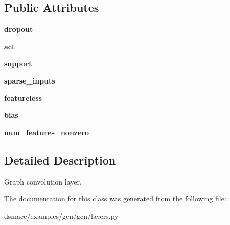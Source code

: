 \subsection*{Public Attributes}
\begin{DoxyCompactItemize}
\item 
\mbox{\label{classgcn_1_1layers_1_1GraphConvolution_a55566986f13fec70ecf245a72c54027a}} 
{\bfseries dropout}
\item 
\mbox{\label{classgcn_1_1layers_1_1GraphConvolution_a3b34872ff04fd5f1480f54d26b6fab4b}} 
{\bfseries act}
\item 
\mbox{\label{classgcn_1_1layers_1_1GraphConvolution_afddf607a8ac18269481c249c1d82b46f}} 
{\bfseries support}
\item 
\mbox{\label{classgcn_1_1layers_1_1GraphConvolution_aab6ab179798b8e55fa2c7f2e6337d9f6}} 
{\bfseries sparse\+\_\+inputs}
\item 
\mbox{\label{classgcn_1_1layers_1_1GraphConvolution_a7885c991bce88b777c2318ee03db6ea4}} 
{\bfseries featureless}
\item 
\mbox{\label{classgcn_1_1layers_1_1GraphConvolution_a8df69d91ec92d6767c90186f49dbdd24}} 
{\bfseries bias}
\item 
\mbox{\label{classgcn_1_1layers_1_1GraphConvolution_a4e0b4bc772755a4e233a754b841600a1}} 
{\bfseries num\+\_\+features\+\_\+nonzero}
\end{DoxyCompactItemize}


\subsection{Detailed Description}
\begin{DoxyVerb}Graph convolution layer.\end{DoxyVerb}
 

The documentation for this class was generated from the following file\+:\begin{DoxyCompactItemize}
\item 
dsmacc/examples/gcn/gcn/layers.\+py\end{DoxyCompactItemize}
